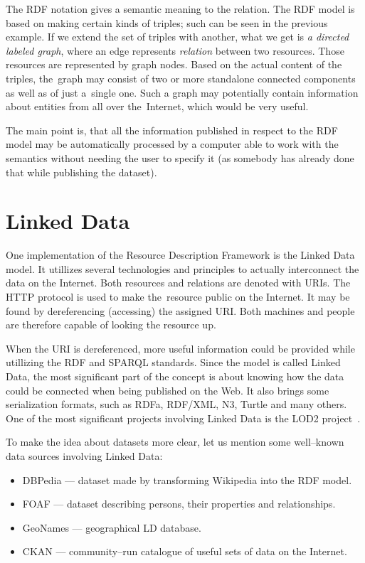 The RDF notation gives a semantic meaning to the relation. The RDF model is based on making certain
kinds of triples; such can be seen in the previous example. If we extend the set of triples with another,
what we get is \emph{a directed labeled graph}, where an edge represents \emph{relation} between two resources.
Those resources are represented by graph nodes. Based on the actual content of the triples,
the~graph may consist of two or more standalone connected components as well as of
just a~single one. Such a graph may potentially contain information about entities from all over
the~Internet, which would be very useful.

The main point is, that all the information published in respect to the RDF model may be
automatically processed by a computer able to work with the semantics without
needing the user to specify it (as somebody has already done that while publishing the dataset).

\section{Linked Data}

One implementation of the Resource Description Framework is the Linked Data model.
It utillizes several technologies and principles to actually interconnect the data on the Internet.
Both resources and relations are denoted with URIs. The HTTP protocol is used to make
the~resource public on the Internet. It may be found by dereferencing (accessing) the assigned
URI. Both machines and people are therefore capable of looking the resource up.

When the URI is dereferenced, more useful information could be provided while utillizing the RDF
and SPARQL standards. Since the model is called Linked Data, the most significant part
of the concept is about knowing how the data could be connected when being published on the Web.
It also brings some serialization formats, such as RDFa, RDF/XML, N3, Turtle and many others.
One of the most significant projects involving Linked Data is the LOD2 project~\cite{lod2}.

To make the idea about datasets more clear, let us mention some well--known data sources
involving Linked Data:

\begin{itemize}
\item DBPedia --- dataset made by transforming Wikipedia into the RDF model.
\item FOAF --- dataset describing persons, their properties and relationships.
\item GeoNames --- geographical LD database.
\item CKAN --- community--run catalogue of useful sets of data on the Internet.
\end{itemize}

